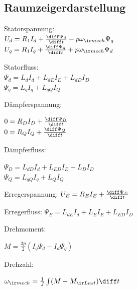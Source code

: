\documentclass[fs, german]{latex4ei_fs}
\begin{document}
\begin{sectionbox}
\subsection{Raumzeigerdarstellung}
Statorspannung:\\
$U_d = R_1 I_d + \frac{\diff \Psi_d}{\diff t} - p \omega_{\ir mech} \Psi_q$\\
$U_q = R_1 I_q + \frac{\diff \Psi_q}{\diff t} + p \omega_{\ir mech} \Psi_d$

Statorfluss: \\
$\Psi_d = L_d I_d + L_{dE} I_E + L_{dD} I_D$ \\
$\Psi_q = L_q I_q +  L_{qQ} I_Q$


Dämpferspannung:

$0 = R_D I_D + \frac{\diff \Psi_D}{\diff t}$ \\
$0 = R_Q I_Q + \frac{\diff \Psi_Q}{\diff t}$

Dämpferfluss:

$\Psi_D = L_{dD} I_d + L_{ED} I_E + L_D I_D$ \\
$\Psi_Q = L_{qQ} I_q + L_{Q} I_{Q}$

Erregerspannung:
$U_E = R_E I_E + \frac{\diff \Psi_E}{\diff t}$

Erregerfluss:
$\Psi_E = L_{dE} I_d + L_E I_E + L_{ED} I_D$

Drehmoment:

$M = \frac{3 p}{2} (I_q \Psi_d - I_d \Psi_q)$

Drehzahl:

$\omega_{\ir mech} = \frac{1}{J} \int (M- M_{\ir Last}) \diff t$

 
 \end{sectionbox} 
\end{document}
